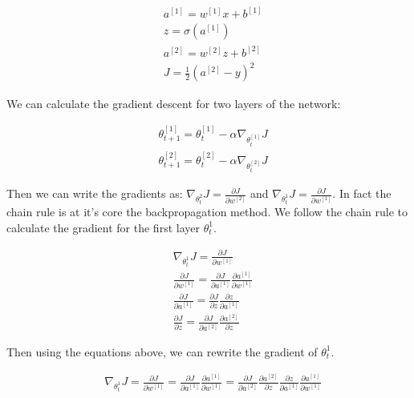 \begin{align}
& a^{[1]} = w^{[1]}x + b^{[1]}\\
& z = \sigma(a^{[1]}) \\
& a^{[2]} = w^{[2]}z + b^{[2]}\\
& J = \frac{1}{2} (a^{[2]} - y)^{2}
\end{align}

We can calculate the gradient descent for two layers of the network:

\begin{align}
  & \theta^{[1]}_{t+1} = \theta^{[1]}_{t} - \alpha \nabla_{\theta^{[1]}_{t}}J\\
& \theta^{[2]}_{t+1} = \theta^{[2]}_{t} - \alpha \nabla_{\theta^{[2]}_{t}}J 
\end{align}

Then we can write the gradients as: $\nabla_{\theta^{2}_{t}}J = \frac{\partial J}{\partial w^{[2]}} $ and $\nabla_{\theta^{1}_{t}}J = \frac{\partial J}{\partial w^{[1]}}$. In fact the chain rule is at it's core the backpropagation method. We follow the chain rule to calculate the gradient for the first layer $\theta^{1}_{t}$.

\begin{align}
&  \nabla_{\theta^{1}_{t}}J = \frac{\partial J}{\partial w^{[1]}} \\
&  \frac{\partial J}{\partial w^{[1]}} = \frac{\partial J}{\partial a^{[1]}}\frac{\partial a^{[1]}}{\partial w^{[1]}} \\
&  \frac{\partial J}{\partial a^{[1]}}  =\frac{\partial J}{\partial z}\frac{\partial z}{\partial a^{[1]}} \\
&  \frac{\partial J}{\partial z} = \frac{\partial J}{\partial a^{[2]}}\frac{\partial a^{[2]}}{\partial z}
\end{align}

Then using the equations above, we can rewrite the gradient of $\theta^{1}_{t}$.


\begin{align}
&  \nabla_{\theta^{1}_{t}}J = \frac{\partial J}{\partial w^{[1]}} = \frac{\partial J}{\partial a^{[1]}}\frac{\partial a^{[1]}}{\partial w^{[1]}} = \frac{\partial J}{\partial a^{[2]}}\frac{\partial a^{[2]}}{\partial z}\frac{\partial z}{\partial a^{[1]}}\frac{\partial a^{[1]}}{\partial w^{[1]}} \\
\end{align}

